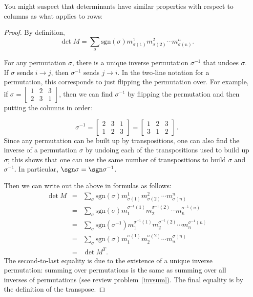 You might suspect that determinants have similar properties with respect to columns as what applies to rows:

\begin{center}
\end{center}

\begin{proof}
  By definition, \[
\det M = \sum_{\sigma} \text{sgn}(\sigma) m^1_{\sigma(1)}m^2_{\sigma(2)}\cdots m^n_{\sigma(n)}.
\]

For any permutation $\sigma$, there is a unique inverse permutation $\sigma^{-1}$ that undoes $\sigma$.  If $\sigma$ sends $i\rightarrow j$, then $\sigma^{-1}$ sends $j\rightarrow i$.  In the two-line notation for a permutation, this corresponds to just flipping the permutation over.  For example, if $\sigma=\begin{bmatrix} 
1 & 2 & 3 \\
2 & 3 & 1
\end{bmatrix}$, then we can find $\sigma^{-1}$ by flipping the permutation and then putting the columns in order:

\[
\sigma^{-1}=\begin{bmatrix} 
2 & 3 & 1 \\
1 & 2 & 3
\end{bmatrix}=\begin{bmatrix} 
1 & 2 & 3 \\
3 & 1 & 2
\end{bmatrix}\, .
\]
Since any permutation can be built up by transpositions, one can also find the inverse of a permutation $\sigma$ by undoing each of the transpositions used to build up $\sigma$; this shows that one can use the same number of transpositions to build $\sigma$ and $\sigma^{-1}$.  In particular, $\sgn \sigma= \sgn \sigma^{-1}$.


Then we can write out the above in formulas as follows:
\begin{eqnarray*}
\det M &=& \sum_{\sigma} \text{sgn}(\sigma) m^1_{\sigma(1)}m^2_{\sigma(2)}\cdots m^n_{\sigma(n)} \\
&=& \sum_{\sigma} \text{sgn}(\sigma) m_1^{\sigma^{-1}(1)}m_2^{\sigma^{-1}(2)}\cdots m_n^{\sigma^{-1}(n)} \\
&=& \sum_{\sigma} \text{sgn}(\sigma^{-1}) m_1^{\sigma^{-1}(1)}m_2^{\sigma^{-1}(2)}\cdots m_n^{\sigma^{-1}(n)} \\
&=& \sum_{\sigma} \text{sgn}(\sigma) m_1^{\sigma(1)}m_2^{\sigma(2)}\cdots m_n^{\sigma(n)} \\
&=& \det M^T.
\end{eqnarray*}
The second-to-last equality is due to the existence of a unique inverse permutation: summing over permutations is the same as summing over all inverses of permutations (see review problem~\ref{invsum}).  The final equality is by the definition of the transpose.
\end{proof}

